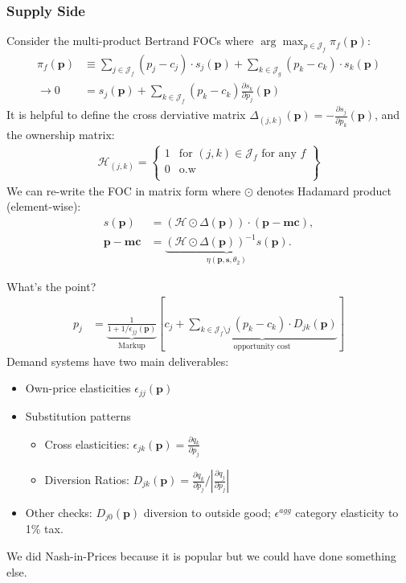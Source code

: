 \begin{frame}
\frametitle{Supply Side}
\footnotesize
Consider the multi-product Bertrand FOCs where $\arg \max_{p \in \mathcal{J}_f} \pi_f (\mathbf{p})$:
{\begin{align*}
\pi_f (\mathbf{p}) &\equiv \sum_{j \in \mathcal{J}_f} (p_j - c_j) \cdot s_j(\mathbf{p}) + \sum_{k \in \mathcal{J}_g} (p_k - c_k) \cdot s_k(\mathbf{p}) \\
\rightarrow 0&= s_j(\mathbf{p}) + \sum_{k \in \mathcal{J}_f} (p_k - c_k) \frac{\partial s_{k}}{\partial p_j}(\mathbf{p}) 
\end{align*}
}
It is helpful to define the \alert{cross derviative matrix} $\Delta_{(j,k)}(\mathbf{p})  = - \frac{\partial s_{j}}{\partial p_k}(\mathbf{p})$, and the \alert{ownership matrix}:
\begin{align*}
\mathcal{H}_{(j,k)} = \left\{\begin{array}{lr}
          1 & \text{for }  (j,k) \in \mathcal{J}_f \text{ for any } f \\ 
      0 & \text{o.w}\\
        \end{array} \right\}
\end{align*}
We can re-write the FOC in matrix form where $\odot$ denotes Hadamard product (element-wise):
\begin{align*}
        s(\mathbf{p}) &= (\mathcal{H} \odot \Delta(\mathbf{p})) \cdot (\mathbf{p} - \mathbf{mc}), \\
       \mathbf{p}-\mathbf{mc} &=  \underbrace{(\mathcal{H} \odot \Delta(\mathbf{p}))^{-1} s(\mathbf{p})}_{\eta(\mathbf{p},\mathbf{s},\theta_2)}.
\end{align*}
\end{frame}


\begin{frame}{What's the point?}
\begin{align*}
p_j &= \underbrace{\frac{1}{1+1/\epsilon_{jj}(\mathbf{p})}}_{\text{Markup}} \left[c_j + \underbrace{\sum_{k \in \mathcal{J}_{f} \setminus j}  (p_k-c_k) \cdot  D_{jk} (\mathbf{p}) }_{\text{opportunity cost}}\right]
\end{align*}
Demand systems have two main deliverables:
\begin{itemize}
\item Own-price elasticities $\epsilon_{jj}(\mathbf{p})$
\item Substitution patterns
\begin{itemize}
\item Cross elasticities: $\epsilon_{jk}(\mathbf{p}) = \frac{\partial q_k}{\partial p_j}$
\item Diversion Ratios: $D_{jk}(\mathbf{p}) = \frac{\partial q_k}{\partial p_j}/|\frac{\partial q_j}{\partial p_j}|$
\end{itemize}
\item Other checks: $D_{j0}(\mathbf{p})$ diversion to outside good; $\epsilon^{agg}$ category elasticity to 1\% tax.
\end{itemize}
We did Nash-in-Prices because it is popular but we could have done something else.
\end{frame}




